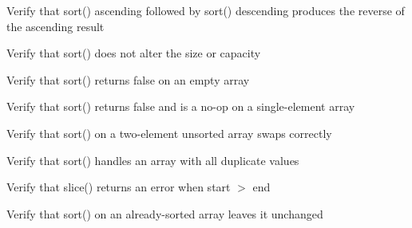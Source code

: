 \begin{DoxyRefList}
%
Verify that sort() ascending followed by sort() descending produces the reverse of the ascending result  
\item[Global \doxylink{test__array_8cpp_a09c7fddcdcdacb31833850310fb6c9e7}{TEST\+\_\+F} (\doxylink{classArrayInitTest}{Array\+Init\+Test}, Sort\+Preserves\+Size\+And\+Capacity)]\label{test__test000146}%
%
Verify that sort() does not alter the size or capacity  
\item[Global \doxylink{test__array_8cpp_ad732672dfd0929b4a6773758f8e83f81}{TEST\+\_\+F} (\doxylink{classArrayInitTest}{Array\+Init\+Test}, Sort\+Empty\+Array\+Returns\+False)]\label{test__test000145}%
%
Verify that sort() returns false on an empty array  
\item[Global \doxylink{test__array_8cpp_a0c55cdaaa91183acae673670cd165a05}{TEST\+\_\+F} (\doxylink{classArrayInitTest}{Array\+Init\+Test}, Sort\+Single\+Element\+Returns\+False)]\label{test__test000144}%
%
Verify that sort() returns false and is a no-\/op on a single-\/element array  
\item[Global \doxylink{test__array_8cpp_ac2b10592b7027fef8fabb7a104f04436}{TEST\+\_\+F} (\doxylink{classArrayInitTest}{Array\+Init\+Test}, Sort\+Two\+Element\+Array)]\label{test__test000143}%
%
Verify that sort() on a two-\/element unsorted array swaps correctly  
\item[Global \doxylink{test__array_8cpp_a2a4acb02859025f3f19286451e51de06}{TEST\+\_\+F} (\doxylink{classArrayInitTest}{Array\+Init\+Test}, Sort\+All\+Duplicates)]\label{test__test000142}%
%
Verify that sort() handles an array with all duplicate values  
\item[Global \doxylink{test__array_8cpp_a112182d204155777d2953363be2ecd50}{TEST\+\_\+F} (\doxylink{classArrayInitTest}{Array\+Init\+Test}, Slice\+Start\+Greater\+Than\+End\+Returns\+Error)]\label{test__test000113}%
%
Verify that slice() returns an error when start \texorpdfstring{$>$}{>} end  
\item[Global \doxylink{test__array_8cpp_a30c78418834bd9dc494cc781a0dbfe0f}{TEST\+\_\+F} (\doxylink{classArrayInitTest}{Array\+Init\+Test}, Sort\+Already\+Sorted\+Array)]\label{test__test000140}%
%
Verify that sort() on an already-\/sorted array leaves it unchanged  
\item[Global \doxylink{test__array_8cpp_a264e82653cc9a18f96735f241556ced3}{TEST\+\_\+F} (\doxylink{classArrayInitTest}{Array\+Init\+Test}, Sort\+Int\+Ascending\+With\+Lambda)]\label{test__test000139}%

\end{DoxyRefList}
